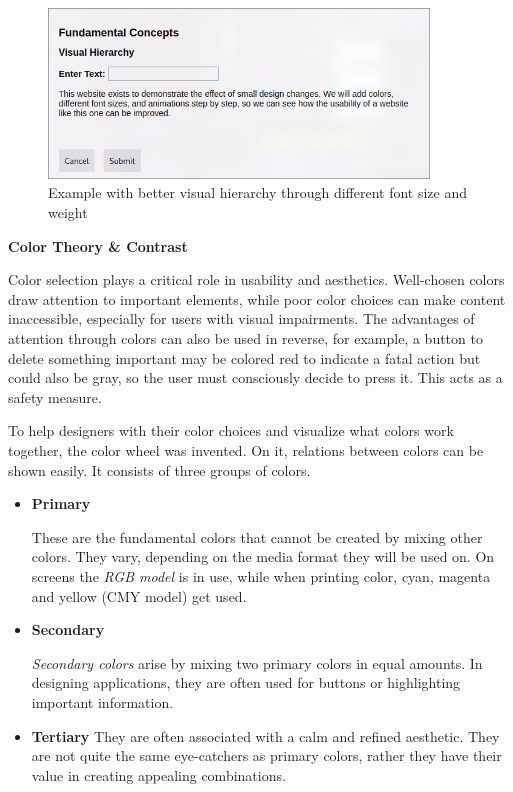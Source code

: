     \blankLine

    \begin{figure} [H]
        \center
        \includegraphics [width=0.9\textwidth] {images/paul/usabilityExamples/visualHierarchy.png}
        \caption{Example with better visual hierarchy through different font size and weight}
    \end{figure}

\blankLine

\textbf{Color Theory \& Contrast}

Color selection plays a critical role in usability and aesthetics. Well-chosen colors draw attention to important elements, while poor color choices can make content inaccessible, especially for users with visual impairments. The advantages of attention through colors can also be used in reverse, for example, a button to delete something important may be colored red to indicate a fatal action but could also be gray, so the user must consciously decide to press it. This acts as a safety measure. 

\blankLine

To help designers with their color choices and visualize what colors work together, the color wheel was invented. On it, relations between colors can be shown easily. It consists of three groups of colors. 

\begin{itemize}
    \item \textbf{Primary}
    
    These are the fundamental colors that cannot be created by mixing other colors. They vary, depending on the media format they will be used on. On screens the \textit{RGB model} is in use, while when printing color, cyan, magenta and yellow (CMY model) get used.

    \item \textbf{Secondary}
    
    \textit{Secondary colors} arise by mixing two primary colors in equal amounts. In designing applications, they are often used for buttons or highlighting important information.

    \item \textbf{Tertiary}
    They are often associated with a calm and refined aesthetic. They are not quite the same eye-catchers as primary colors, rather they have their value in creating appealing combinations.
    
\end{itemize}

